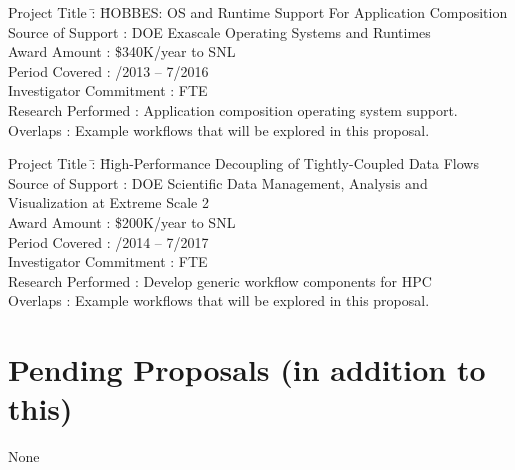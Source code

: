 \documentclass[10pt]{article}
\begin{document}
\begin{tabbing}
Project Title \hspace{5.5em}\=: \=  HOBBES: OS and Runtime Support For Application Composition\\
Source of Support           \>:  DOE Exascale Operating Systems and Runtimes\\
Award Amount                \>: \> \$340K/year to SNL\\
Period Covered              \>: /2013 -- 7/2016\\
Investigator Commitment     \>:  FTE\\
Research Performed          \>: \> Application composition operating system support.\\
Overlaps                    \>: \> Example workflows that will be explored in this proposal.\\
\end{tabbing}

\begin{tabbing}
Project Title \hspace{5.5em}\=: \= High-Performance Decoupling of Tightly-Coupled Data Flows\\
Source of Support           \>: \> DOE Scientific Data Management, Analysis and Visualization at Extreme Scale 2\\
Award Amount                \>: \> \$200K/year to SNL\\
Period Covered              \>: /2014 -- 7/2017\\
Investigator Commitment     \>:  FTE\\
Research Performed          \>: \> Develop generic workflow components for HPC\\
Overlaps                    \>: \> Example workflows that will be explored in this proposal.\\
\end{tabbing}

\section*{Pending Proposals (in addition to this)}

None
\end{document}
